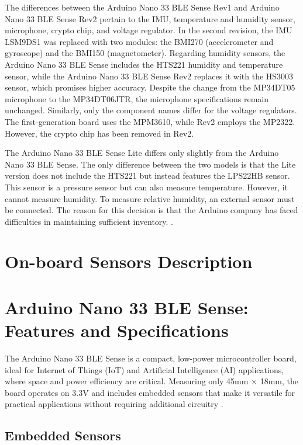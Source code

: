 	The differences between the Arduino Nano 33 BLE Sense Rev1 and Arduino Nano 33 BLE Sense Rev2 pertain to the IMU, temperature and humidity sensor, microphone, crypto chip, and voltage regulator. In the second revision, the IMU LSM9DS1 was replaced with two modules: the BMI270 (accelerometer and gyroscope) and the BMI150 (magnetometer). Regarding humidity sensors, the Arduino Nano 33 BLE Sense includes the HTS221 humidity and temperature sensor, while the Arduino Nano 33 BLE Sense Rev2 replaces it with the HS3003 sensor, which promises higher accuracy. Despite the change from the MP34DT05 microphone to the MP34DT06JTR, the microphone specifications remain unchanged. Similarly, only the component names differ for the voltage regulators. The first-generation board uses the MPM3610, while Rev2 employs the MP2322. However, the crypto chip has been removed in Rev2.
	
	The Arduino Nano 33 BLE Sense Lite differs only slightly from the Arduino Nano 33 BLE Sense. The only difference between the two models is that the Lite version does not include the HTS221 but instead features the LPS22HB sensor. This sensor is a pressure sensor but can also measure temperature. However, it cannot measure humidity. To measure relative humidity, an external sensor must be connected. The reason for this decision is that the Arduino company has faced difficulties in maintaining sufficient inventory. \cite{ArduinoForum2023}.
	
\section{On-board Sensors Description}

	
	\section{Arduino Nano 33 BLE Sense: Features and Specifications}
	
	The Arduino Nano 33 BLE Sense is a compact, low-power microcontroller board, ideal for Internet of Things (IoT) and Artificial Intelligence (AI) applications, where space and power efficiency are critical. Measuring only 45mm \( \times \) 18mm, the board operates on 3.3V and includes embedded sensors that make it versatile for practical applications without requiring additional circuitry \cite{ArduinoNano33Sense2025}. 
	
	\subsection{Embedded Sensors}
	
